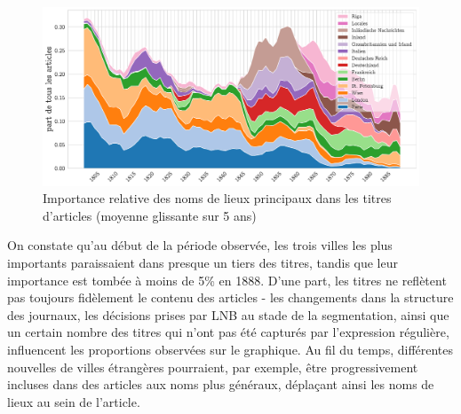 \documentclass[a4paper,twoside,12pt]{article}
\begin{document}
\begin{figure}[h]
\centering
\captionsetup{justification=centering}
\includegraphics[width=\textwidth]{images/headings_places.pdf}
\caption{Importance relative des noms de lieux principaux dans les titres d'articles (moyenne glissante sur 5 ans)}
\label{fig:headings_places}
\end{figure}

On constate qu'au début de la période observée, les trois villes les plus importants paraissaient dans presque un tiers des titres, tandis que leur importance est tombée à moins de 5\% en 1888. D'une part, les titres ne reflètent pas toujours fidèlement le contenu des articles - les changements dans la structure des journaux, les décisions prises par LNB au stade de la segmentation, ainsi que un certain nombre des titres qui n'ont pas été capturés par l'expression régulière, influencent les proportions observées sur le graphique. Au fil du temps, différentes nouvelles de villes étrangères pourraient, par exemple, être progressivement incluses dans des articles aux noms plus généraux, déplaçant ainsi les noms de lieux au sein de l'article.
\end{document}

